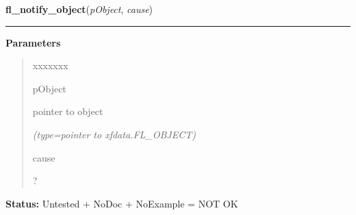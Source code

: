     \label{xformslib:library:fl_notify_object}

    \vspace{0.5ex}

\hspace{.8\funcindent}\begin{boxedminipage}{\funcwidth}

    \raggedright \textbf{fl\_notify\_object}(\textit{pObject}, \textit{cause})

    \vspace{-1.5ex}

    \rule{\textwidth}{0.5\fboxrule}
\setlength{\parskip}{2ex}
\setlength{\parskip}{1ex}
      \textbf{Parameters}
      \vspace{-1ex}

      \begin{quote}
        \begin{Ventry}{xxxxxxx}

          \item[pObject]

          pointer to object

            {\it (type=pointer to xfdata.FL\_OBJECT)}

          \item[cause]

          ?

        \end{Ventry}

      \end{quote}

\textbf{Status:} Untested + NoDoc + NoExample = NOT OK



    \end{boxedminipage}

    \label{xformslib:library:fl_set_object_lalign}

    \vspace{0.5ex}

